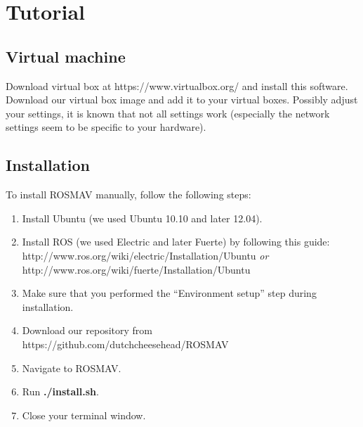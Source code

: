 \documentclass[a4paper,10pt]{article}
\begin{document}
\section{Tutorial}
\subsection{Virtual machine}
Download virtual box at https://www.virtualbox.org/ and install this software. 
Download our virtual box image and add it to your virtual boxes. 
Possibly adjust your settings, it is known that not all settings work (especially the network settings seem to be specific to your hardware). 

\subsection{Installation}
To install ROSMAV manually, follow the following steps:
\begin{enumerate}
\item Install Ubuntu (we used Ubuntu 10.10 and later 12.04).

\item Install ROS (we used Electric and later Fuerte) by following this guide: \\
	  http://www.ros.org/wiki/electric/Installation/Ubuntu \textit{or}\\
	  http://www.ros.org/wiki/fuerte/Installation/Ubuntu

\item Make sure that you performed the ``Environment setup'' step during installation.

\item Download our repository from
      https://github.com/dutchcheesehead/ROSMAV

\item Navigate to ROSMAV.

\item Run \textbf{./install.sh}.
\item Close your terminal window.
\end{enumerate}
\end{document}
